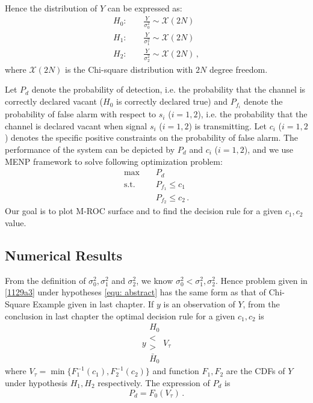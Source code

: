Hence the distribution of $Y$ can be expressed as:
\begin{equation} 
  \label{equ: abstract}
  \begin{split}
	H_0:\;\;\;\;&\frac{Y}{\sigma_0^2}\sim \mathcal{X}(2N)\\
	H_1:\;\;\;\;&\frac{Y}{\sigma_1^2}\sim \mathcal{X}(2N)\\
	H_2:\;\;\;\;&\frac{Y}{\sigma_2^2}\sim \mathcal{X}(2N)\,,
  \end{split}
\end{equation}
where $\mathcal{X}(2N)$ is the Chi-square distribution with $2N$ degree freedom. 

Let $P_d$ denote the probability of detection, i.e. the probability that the channel is correctly declared vacant ($H_0$ is correctly declared true) and $P_{f_i}$ denote the probability of false alarm with respect to $s_i$ ($i = 1, 2$), i.e. the probability that the channel is declared vacant when signal $s_i$ ($i = 1, 2$) is transmitting. Let $c_i$ ($i = 1, 2$) denotes the specific positive constraints on the probability of false alarm. The performance of the system can be depicted by $P_d$ and $c_i$ ($i = 1, 2$), and we use MENP framework to solve following optimization problem:
\begin{equation}
  \begin{split}
	\max\;\;\;\;&P_d\\
	\text{s.t.}\;\;\;\;&P_{f_1}\leq c_1\\
	&P_{f_2} \leq c_2\,.
  \end{split}
  \label{1129a3}
\end{equation}
Our goal is to plot M-ROC surface and to find the decision rule for a given $c_1, c_2$ value.

\subsection{Numerical Results}
From the definition of $\sigma_0^2, \sigma_1^2$ and $\sigma_2^2$, we know $\sigma_0^2 < \sigma_1^2, \sigma_2^2$. Hence  problem given in \eqref{1129a3} under hypotheses \eqref{equ: abstract} has the same form as that of Chi-Square Example given in last chapter. 
If $y$ is an observation of $Y$, 
from the conclusion in last chapter the optimal  decision rule for a given $c_1, c_2$ is 
\begin{equation}
  y \substack{H_0 \\ < \\ > \\ \bar{H}_0} V_\tau
  \label{equ:1129a4}
\end{equation}
where $V_\tau = \min\{F_1^{-1}(c_1),  F_2^{-1}(c_2)\}$ and function $F_1,  F_2$ are the CDFs of $Y$ under hypothesis $H_1, H_2$ respectively. The expression of $P_d$ is 
\begin{equation}
  P_d = F_0(V_\tau)\,.
  \label{equ:1129a5}
\end{equation}

